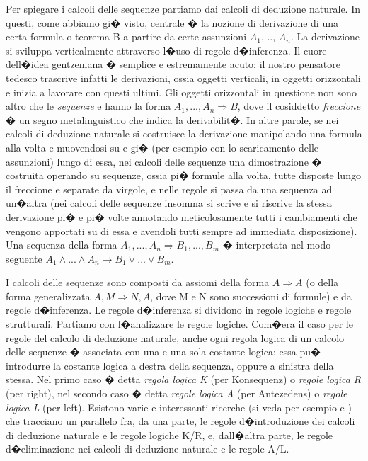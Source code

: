 \documentclass[a4paper,12pt]{aphex}
\begin{document}
 
Per spiegare i calcoli delle sequenze partiamo dai calcoli di deduzione naturale. In questi, come abbiamo gi� visto, centrale � la nozione di derivazione di una certa formula o teorema B a partire da certe assunzioni $A_{1}$, .., $A_{n}$. La derivazione si sviluppa verticalmente attraverso l�uso di regole d�inferenza. Il cuore dell�idea gentzeniana � semplice e estremamente acuto: il nostro pensatore tedesco trascrive infatti le derivazioni, ossia oggetti verticali, in oggetti orizzontali e inizia a lavorare con questi ultimi. Gli oggetti orizzontali in questione non sono altro che le \emph{sequenze}  e hanno la forma $A_{1}, ..., A_{n}\Rightarrow B$, dove il cosiddetto \emph{freccione} � un segno metalinguistico che indica la derivabilit�. In altre parole, se nei calcoli di deduzione naturale si costruisce la derivazione manipolando una formula alla volta e muovendosi su e  gi� (per esempio con lo scaricamento delle assunzioni) lungo di essa, nei calcoli delle sequenze una dimostrazione � costruita operando su sequenze, ossia pi� formule alla volta, tutte disposte lungo il freccione e separate da virgole,  e nelle regole si passa da una sequenza ad un�altra (nei calcoli delle sequenze insomma si scrive e si riscrive la stessa derivazione pi� e pi� volte annotando meticolosamente tutti i cambiamenti che vengono apportati su di essa e avendoli tutti sempre ad immediata disposizione). Una sequenza della forma $A_{1}, ..., A_{n}\Rightarrow B_{1}, ..., B_{m}$ � interpretata nel modo seguente $A_{1}\wedge ...\wedge A_{n}\rightarrow B_{1}\vee ...\vee B_{m}$.
 
I calcoli delle sequenze sono composti da assiomi della forma $A\Rightarrow A$ (o della forma generalizzata $A, M\Rightarrow N, A$, dove M e N sono successioni di formule) e da regole d�inferenza. Le regole d�inferenza si dividono in regole logiche e regole strutturali.    Partiamo con l�analizzare le regole logiche.  Com�era il caso per le regole del calcolo di deduzione naturale, anche ogni regola logica di un calcolo delle sequenze � associata con una e una sola costante logica: essa pu� introdurre la costante logica a destra della sequenza, oppure a sinistra della stessa.  Nel primo caso � detta \emph{regola logica K} (per Konsequenz) o \emph{regole logica R} (per right), nel secondo caso � detta \emph{regole logica A} (per Antezedens) o \emph{regole logica L} (per left). Esistono varie e interessanti ricerche (si veda per esempio \cite{prawitz2} e \cite{prooftheory}) che tracciano un parallelo fra, da una parte, le regole d�introduzione dei calcoli di deduzione naturale e le regole logiche K/R, e, dall�altra parte, le regole d�eliminazione nei calcoli di deduzione naturale e le regole A/L. 
\end{document}
